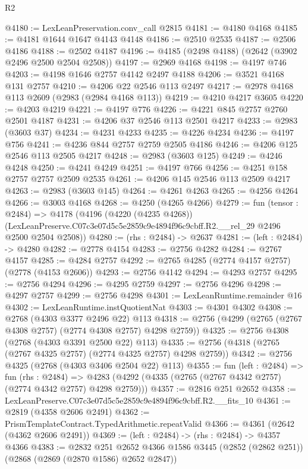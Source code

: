 \begin{lexlean}{R2}
\begin{coremodule}
@4180 := LexLeanPreservation.conv_call @2815
@4181 := @4180 @4168
@4185 := @4181 @1644 @1647 @4143 @4148
@4186 := @2510 @2535
@4187 := @2506 @4186
@4188 := @2502 @4187
@4196 := @4185 (@2498 @4188) (@2642 (@3902 @2496 @2500 @2504 @2508))
@4197 := @2969 @4168
@4198 := @4197 @746
@4203 := @4198 @1646 @2757 @4142 @2497 @4188
@4206 := @3521 @4168 @131 @2757
@4210 := @4206 @22 @2546 @113 @2497
@4217 := @2978 @4168 @113 @2609 (@2983 (@2984 @4168 @113))
@4219 := @4210 @4217 @3605
@4220 := @4203 @4219
@4221 := @4197 @776
@4226 := @4221 @845 @2757 @2760 @2501 @4187
@4231 := @4206 @37 @2546 @113 @2501 @4217
@4233 := @2983 (@3603 @37)
@4234 := @4231 @4233
@4235 := @4226 @4234
@4236 := @4197 @756
@4241 := @4236 @844 @2757 @2759 @2505 @4186
@4246 := @4206 @125 @2546 @113 @2505 @4217
@4248 := @2983 (@3603 @125)
@4249 := @4246 @4248
@4250 := @4241 @4249
@4251 := @4197 @766
@4256 := @4251 @158 @2757 @2757 @2509 @2535
@4261 := @4206 @145 @2546 @113 @2509 @4217
@4263 := @2983 (@3603 @145)
@4264 := @4261 @4263
@4265 := @4256 @4264
@4266 := @3003 @4168
@4268 := @4250 (@4265 @4266)
@4279 := fun (tensor : @2484) =>
  @4178
    (@4196
      (@4220 (@4235 @4268))
      (LexLeanPreserve.C07c3e07d5c5e2859c9e4894f96c9cbff.R2.__rel_29 @2496 @2500 @2504 @2508))
@4280 := (rhs : @2484) -> @2637
@4281 := (left : @2484) -> @4280
@4282 := @2778 @4154
@4283 := @2756 @4282
@4284 := @2767 @4157
@4285 := @4284 @2757
@4292 := @2765 @4285 (@2774 @4157 @2757) (@2778 (@4153 @2606))
@4293 := @2756 @4142
@4294 := @4293 @2757
@4295 := @2756 @4294
@4296 := @4295 @2759
@4297 := @2756 @4296
@4298 := @4297 @2757
@4299 := @2756 @4298
@4301 := LexLeanRuntime.remainder @16
@4302 := LexLeanRuntime.instQuotientNat
@4303 := @4301 @4302
@4308 := @2768 (@4303 @3377 @2496 @22) @113
@4318 := @2756 (@4299 (@2765 (@2767 @4308 @2757) (@2774 @4308 @2757) @4298 @2759))
@4325 := @2756 @4308 (@2768 (@4303 @3391 @2500 @22) @113)
@4335 := @2756 (@4318 (@2765 (@2767 @4325 @2757) (@2774 @4325 @2757) @4298 @2759))
@4342 := @2756 @4325 (@2768 (@4303 @3406 @2504 @22) @113)
@4355 := fun (left : @2484) =>
  fun (rhs : @2484) =>
  @4283 (@4292 (@4335 (@2765 (@2767 @4342 @2757) (@2774 @4342 @2757) @4298 @2759)))
@4357 := @2816 @251 @2652
@4358 := LexLeanPreserve.C07c3e07d5c5e2859c9e4894f96c9cbff.R2.__fits_10
@4361 := @2819 (@4358 @2606 @2491)
@4362 := PrismTemplateContract.TypedArithmetic.repeatValid
@4366 := @4361 (@2642 (@4362 @2606 @2491))
@4369 := (left : @2484) -> (rhs : @2484) -> @4357 @4366
@4383 := @2832
    @251
    @2652
    @4366
    @1586
    @3445
    (@2852 (@2862 @251))
    (@2868 (@2869 (@2870 @1586) @2652 @2847))

\end{coremodule}
\end{lexlean}
